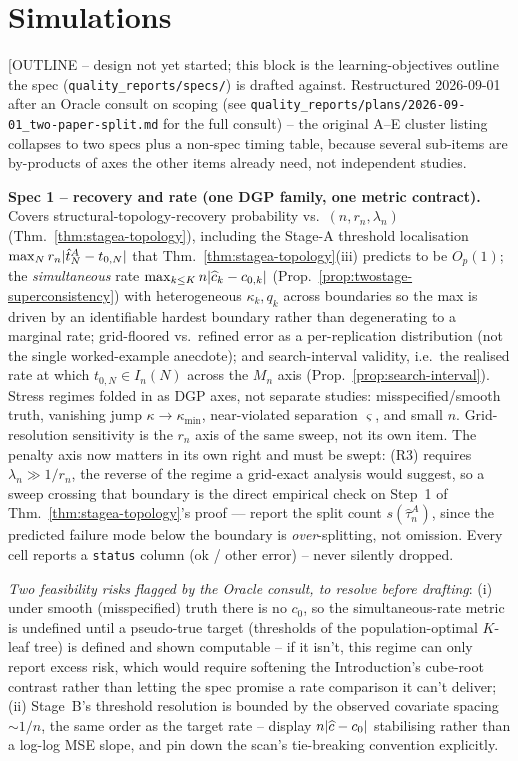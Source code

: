 \documentclass[11pt]{article}
\theoremstyle{plain}
\theoremstyle{definition}
\theoremstyle{remark}
\DeclarePairedDelimiter{\abs}{\lvert}{\rvert}
\begin{document}
\section{Simulations}\label{sec:simulations}
[OUTLINE -- design not yet started; this block is the learning-objectives
outline the spec (\texttt{quality\_reports/specs/}) is drafted against.
Restructured 2026-09-01 after an Oracle consult on scoping (see
\texttt{quality\_reports/plans/2026-09-01\_two-paper-split.md} for the
full consult) -- the original A--E cluster listing collapses to two specs
plus a non-spec timing table, because several sub-items are by-products
of axes the other items already need, not independent studies.

\textbf{Spec 1 -- recovery and rate (one DGP family, one metric contract).}
Covers structural-topology-recovery probability vs.\ $(n,r_n,\lambda_n)$
(Thm.~\ref{thm:stagea-topology}), including the Stage-A threshold
localisation $\max_N r_n\abs{\hat t^A_N-t_{0,N}}$ that
Thm.~\ref{thm:stagea-topology}(iii) predicts to be $O_p(1)$; the
\emph{simultaneous} rate $\max_{k\le K}n\abs{\widehat c_k-c_{0,k}}$
(Prop.~\ref{prop:twostage-superconsistency}) with heterogeneous
$\kappa_k,q_k$ across boundaries so the max is driven by an identifiable
hardest boundary rather than degenerating to a marginal rate; grid-floored
vs.\ refined error as a per-replication distribution (not the single
worked-example anecdote); and search-interval validity, i.e.\ the realised
rate at which $t_{0,N}\in I_n(N)$ across the $M_n$ axis
(Prop.~\ref{prop:search-interval}). Stress regimes folded in as DGP
axes, not separate studies: misspecified/smooth truth, vanishing jump
$\kappa\to\kappa_{\min}$, near-violated separation $\varsigma$, and small
$n$. Grid-resolution sensitivity is the $r_n$ axis of the same sweep, not
its own item. The penalty axis now matters in its own right and must be
swept: (R3) requires $\lambda_n\gg1/r_n$, the reverse of the regime a
grid-exact analysis would suggest, so a sweep crossing that boundary is the
direct empirical check on Step~1 of Thm.~\ref{thm:stagea-topology}'s proof ---
report the split count $s(\hat\tau^A_n)$, since the predicted failure mode
below the boundary is \emph{over}-splitting, not omission. Every cell reports a
\texttt{status} column (ok / other error) -- never silently dropped.

\emph{Two feasibility risks flagged by the Oracle consult, to resolve
before drafting}: (i) under smooth (misspecified) truth there is no
$c_0$, so the simultaneous-rate metric is undefined until a pseudo-true
target (thresholds of the population-optimal $K$-leaf tree) is defined
and shown computable -- if it isn't, this regime can only report excess
risk, which would require softening the Introduction's cube-root
contrast rather than letting the spec promise a rate comparison it can't
deliver; (ii) Stage~B's threshold resolution is bounded by the observed
covariate spacing $\sim1/n$, the same order as the target rate --
display $n\abs{\widehat c-c_0}$ stabilising rather than a log-log MSE
slope, and pin down the scan's tie-breaking convention explicitly.
\end{document}
